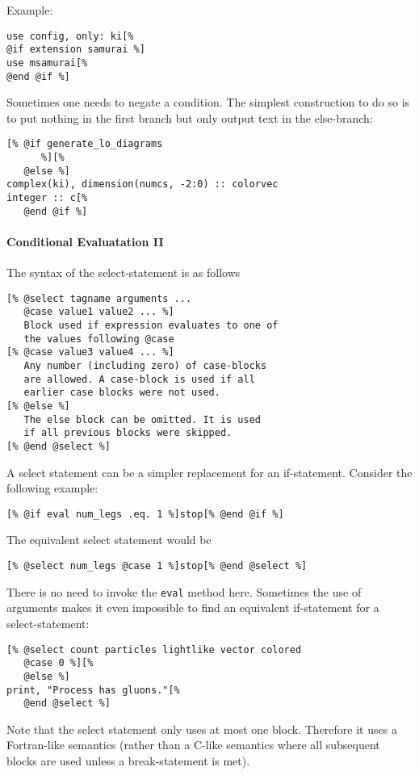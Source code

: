 \documentclass[11pt,a4paper]{refrep}
\begin{document}
Example:
\begin{lstlisting}
use config, only: ki[%
@if extension samurai %]
use msamurai[%
@end @if %]
\end{lstlisting}

Sometimes one needs to negate a condition. The simplest construction
to do so is to put nothing in the first branch but only output text
in the else-branch:
\begin{lstlisting}
[% @if generate_lo_diagrams
      %][%
   @else %]
complex(ki), dimension(numcs, -2:0) :: colorvec
integer :: c[%
   @end @if %]
\end{lstlisting}

\paragraph{Conditional Evaluatation II}
The syntax of the select-statement is as follows
\begin{lstlisting}[language=gosamt]
[% @select tagname arguments ...
   @case value1 value2 ... %]
   Block used if expression evaluates to one of
   the values following @case
[% @case value3 value4 ... %]
   Any number (including zero) of case-blocks
   are allowed. A case-block is used if all
   earlier case blocks were not used.
[% @else %]
   The else block can be omitted. It is used
   if all previous blocks were skipped.
[% @end @select %]
\end{lstlisting}

A select statement can be a simpler replacement for an if-statement.
Consider the following example:
\begin{lstlisting}
[% @if eval num_legs .eq. 1 %]stop[% @end @if %]
\end{lstlisting}
The equivalent select statement would be
\begin{lstlisting}
[% @select num_legs @case 1 %]stop[% @end @select %]
\end{lstlisting}
There is no need to invoke the \texttt{eval} method here.
Sometimes the use of arguments makes it even impossible to
find an equivalent if-statement for a select-statement:
\begin{lstlisting}
[% @select count particles lightlike vector colored
   @case 0 %][%
   @else %]
print, "Process has gluons."[%
   @end @select %]
\end{lstlisting}

\attention{} Note that the select statement only uses at most one
block. Therefore it uses a Fortran-like semantics (rather than
a C-like semantics where all subsequent blocks are used unless
a break-statement is met).
\end{document}
